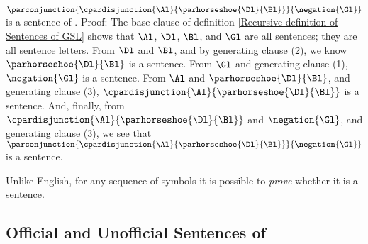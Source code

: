 \begin{majorILnc}{}
$\parconjunction{\cpardisjunction{\Al}{\parhorseshoe{\Dl}{\Bl}}}{\negation{\Gl}}$ is a sentence of \GSL{}. 
Proof: The base clause of definition \ref{Recursive definition of Sentences of GSL} shows that $\Al$, $\Dl$, $\Bl$, and $\Gl$ are all sentences; they are all sentence letters. 
From $\Dl$ and $\Bl$, and by generating clause (2), we know $\parhorseshoe{\Dl}{\Bl}$ is a sentence. 
From $\Gl$ and generating clause (1), $\negation{\Gl}$ is a sentence. 
From $\Al$ and $\parhorseshoe{\Dl}{\Bl}$, and generating clause (3), $\cpardisjunction{\Al}{\parhorseshoe{\Dl}{\Bl}}$ is a sentence. 
And, finally, from $\cpardisjunction{\Al}{\parhorseshoe{\Dl}{\Bl}}$ and $\negation{\Gl}$, and generating clause (3), we see that $\parconjunction{\cpardisjunction{\Al}{\parhorseshoe{\Dl}{\Bl}}}{\negation{\Gl}}$ is a sentence. 
\end{majorILnc}

Unlike English, for any sequence of \GSL{} symbols it is possible to \emph{prove} whether it is a sentence.

\subsection{Official and Unofficial Sentences of \GSL{}}\label{Unofficial Sentences of GSL}

